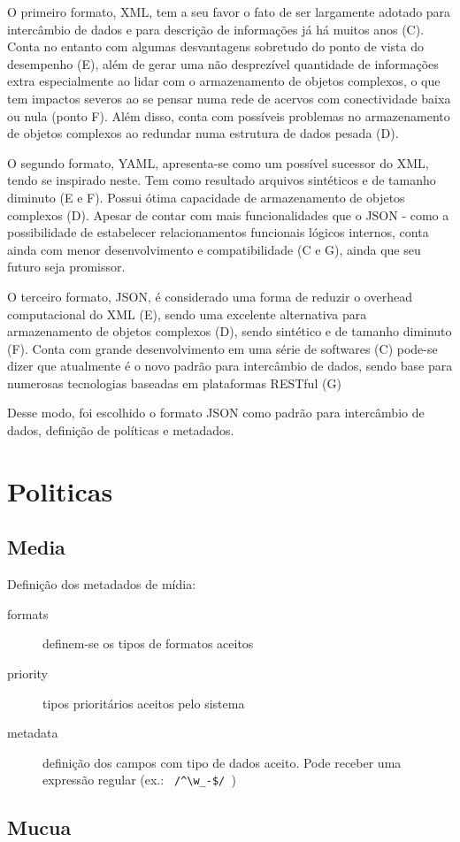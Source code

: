 O primeiro formato, XML, tem a seu favor o fato de ser largamente
adotado para intercâmbio de dados e para descrição de informações já
há muitos anos (C). Conta no entanto com algumas desvantagens
sobretudo do ponto de vista do desempenho (E), além de gerar uma não
desprezível quantidade de informações extra especialmente ao lidar com
o armazenamento de objetos complexos, o que tem impactos severos ao se
pensar numa rede de acervos com conectividade baixa ou nula (ponto
F). Além disso, conta com possíveis problemas no armazenamento de
objetos complexos ao redundar numa estrutura de dados pesada (D).

O segundo formato, YAML, apresenta-se como um possível sucessor do
XML, tendo se inspirado neste. Tem como resultado arquivos sintéticos
e de tamanho diminuto (E e F). Possui ótima capacidade de
armazenamento de objetos complexos (D). Apesar de contar com mais
funcionalidades que o JSON - como a possibilidade de estabelecer
relacionamentos funcionais lógicos internos, conta ainda com menor
desenvolvimento e compatibilidade (C e G), ainda que seu futuro seja
promissor.

O terceiro formato, JSON, é considerado uma forma de reduzir o
overhead computacional do XML (E), sendo uma excelente alternativa
para armazenamento de objetos complexos (D), sendo sintético e de
tamanho diminuto (F). Conta com grande desenvolvimento em uma série de
softwares (C) pode-se dizer que atualmente é o novo padrão para
intercâmbio de dados, sendo base para numerosas tecnologias baseadas
em plataformas RESTful (G)

Desse modo, foi escolhido o formato JSON como padrão para intercâmbio
de dados, definição de políticas e metadados.

\section{Politicas}

\subsection{Media}

Definição dos metadados de mídia:
\begin{description}
  \item[formats] definem-se os tipos de formatos aceitos
  \item[priority] tipos prioritários aceitos pelo sistema
  \item[metadata] definição dos campos com tipo de dados aceito. Pode
    receber uma expressão regular (ex.: \verb| /^\w_-$/ |)
\end{description}



\subsection{Mucua}




